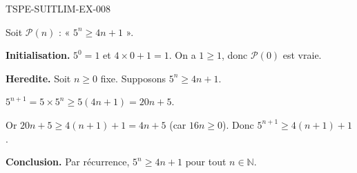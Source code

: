 \begin{corrige}{TSPE-SUITLIM-EX-008}


Soit $\mathcal{P}(n)$ : « $5^n \geq 4n + 1$ ».

\textbf{Initialisation.} $5^0 = 1$ et $4 \times 0 + 1 = 1$. On a $1 \geq 1$, donc $\mathcal{P}(0)$ est vraie.

\textbf{Heredite.} Soit $n \geq 0$ fixe. Supposons $5^n \geq 4n+1$.

$5^{n+1} = 5 \times 5^n \geq 5(4n+1) = 20n + 5$.

Or $20n + 5 \geq 4(n+1) + 1 = 4n + 5$ (car $16n \geq 0$). Donc $5^{n+1} \geq 4(n+1)+1$.

\textbf{Conclusion.} Par récurrence, $\boxed{5^n \geq 4n+1}$ pour tout $n \in \mathbb{N}$.

\end{corrige}
